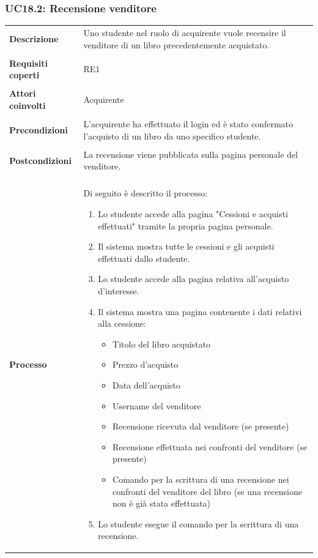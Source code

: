\documentclass[10pt,a4paper]{report}
\begin{document}
	\subsubsection{UC18.2: Recensione venditore}
	\begin{tabular}{lp{}}
		\textbf{Descrizione}&Uno studente nel ruolo di acquirente vuole recensire il venditore di un libro precedentemente acquistato.\\
		\\
		\textbf{Requisiti coperti}&RE1\\
		\\
		\textbf{Attori coinvolti}&Acquirente\\
		\\
		\textbf{Precondizioni}&L'acquirente ha effettuato il login ed è stato confermato l'acquisto di un libro da uno specifico studente.\\
		\\
		\textbf{Postcondizioni}&La recensione viene pubblicata sulla pagina personale del venditore.\\
		\\
		\textbf{Processo}&Di seguito è descritto il processo:
		\begin{enumerate}
			\item Lo studente accede alla pagina "Cessioni e acquisti effettuati" tramite la propria pagina personale.
			\item Il sistema mostra tutte le cessioni e gli acquisti effettuati dallo studente.
			\item Lo studente accede alla pagina relativa all'acquisto d'interesse.
			\item Il sistema mostra una pagina contenente i dati relativi alla cessione:
			\begin{itemize}
				\item Titolo del libro acquistato
				\item Prezzo d'acquisto
				\item Data dell'acquisto
				\item Username del venditore
				\item Recensione ricevuta dal venditore (se presente)
				\item Recensione effettuata nei confronti del venditore (se presente)
				\item Comando per la scrittura di una recensione nei confronti del venditore del libro (se una recensione non è già stata effettuata)
			\end{itemize}
			\item Lo studente esegue il comando per la scrittura di una recensione.

\end{enumerate}
\end{tabular}
\end{document}
